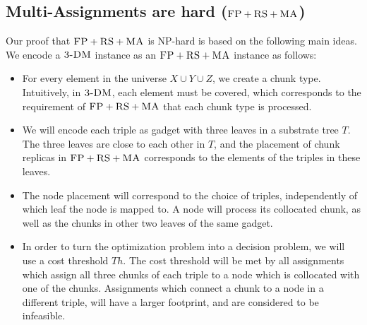 \documentclass[9pt]{sigcomm-alternate}
\newcommand{\FP}{\textsc{FP}}
\newcommand{\RS}{\textsc{RS}}
\newcommand{\MA}{\textsc{MA}}
\newcommand{\Tree}{\ensuremath{T}}
\newcommand{\TDM}{\textsc{3-DM}}
\newcommand{\Thr}{\ensuremath{Th}}
\begin{document}
\subsection{Multi-Assignments are hard ($\FP+\RS+\MA$)}\label{ssec:fprsma}

Our proof that $\FP+\RS+\MA$ is NP-hard is based on the following main ideas.
We encode a $\TDM$ instance as an $\FP+\RS+\MA$ instance as follows:

 \begin{itemize}
 \item For every element in the universe $X\cup Y\cup
 Z$, we create a chunk type. Intuitively, in $\TDM$,
 each element must be covered, which corresponds to the requirement
 of $\FP+\RS+\MA$
 that each chunk type is processed.

 \item We will encode each triple as gadget with three leaves in
 a substrate tree $\Tree$. The three leaves are close to each
 other in $\Tree$, and the placement of chunk replicas in $\FP+\RS+\MA$
 corresponds to the elements of the
 triples in these leaves.

 \item The node placement will correspond to the choice of triples,
 independently of which
leaf the node is mapped to.
 A node will process its collocated chunk,
 as well as the chunks in other two leaves of the same gadget.

\item In order to turn the optimization problem into a decision problem, we will use
a cost threshold $\Thr$. The cost threshold will be met by all
assignments which assign all three chunks of each triple to a
node which is collocated with one of the chunks. Assignments which connect a
chunk to a node in a different triple, will have a larger footprint, and are
considered to be infeasible.

\end{itemize}
\end{document}
